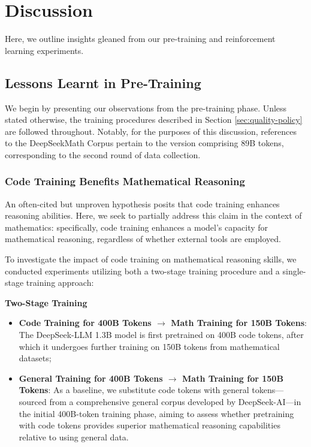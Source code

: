 \section{Discussion}
Here, we outline insights gleaned from our pre-training and reinforcement learning experiments.

\subsection{Lessons Learnt in Pre-Training}

We begin by presenting our observations from the pre-training phase. Unless stated otherwise, the training procedures described in Section \ref{sec:quality-policy} are followed throughout. Notably, for the purposes of this discussion, references to the DeepSeekMath Corpus pertain to the version comprising 89B tokens, corresponding to the second round of data collection.

\subsubsection{Code Training Benefits Mathematical Reasoning}

An often-cited but unproven hypothesis posits that code training enhances reasoning abilities. Here, we seek to partially address this claim in the context of mathematics: specifically, code training enhances a model's capacity for mathematical reasoning, regardless of whether external tools are employed.

To investigate the impact of code training on mathematical reasoning skills, we conducted experiments utilizing both a two-stage training procedure and a single-stage training approach:

\textbf{Two-Stage Training}

\begin{itemize}[topsep=0pt]
    \item \textbf{Code Training for 400B Tokens $\rightarrow$ Math Training for 150B Tokens}: The DeepSeek-LLM 1.3B model is first pretrained on 400B code tokens, after which it undergoes further training on 150B tokens from mathematical datasets;
    \item \textbf{General Training for 400B Tokens $\rightarrow$ Math Training for 150B Tokens}: As a baseline, we substitute code tokens with general tokens—sourced from a comprehensive general corpus developed by DeepSeek-AI—in the initial 400B-token training phase, aiming to assess whether pretraining with code tokens provides superior mathematical reasoning capabilities relative to using general data.
\end{itemize}

